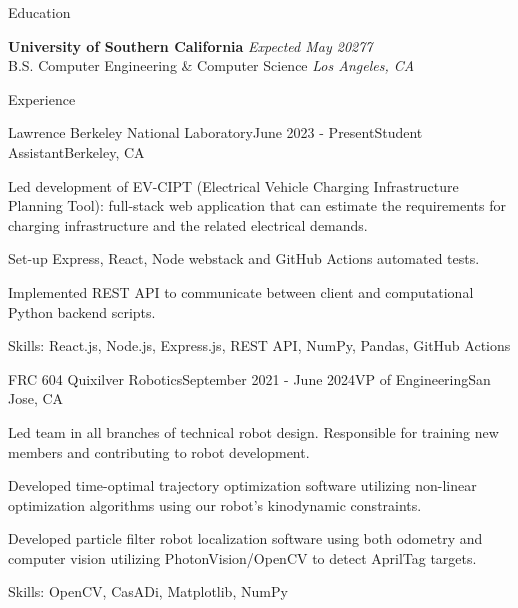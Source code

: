 \documentclass[
	11pt, %
]{tex/resume} %
\begin{document}

\begin{rSection}{Education}
	
	\textbf{University of Southern California} \hfill \textit{Expected May 20277} \\ 
	B.S. Computer Engineering \& Computer Science \hfill \textit{Los Angeles, CA}
	
\end{rSection}


\begin{rSection}{Experience}

	\begin{rSubsection}{Lawrence Berkeley National Laboratory}{June 2023 - Present}{Student Assistant}{Berkeley, CA}
		\item Led development of EV-CIPT (Electrical Vehicle Charging Infrastructure Planning Tool): full-stack web application that can estimate the requirements for charging infrastructure and the related electrical demands.
        \item Set-up Express, React, Node webstack and GitHub Actions automated tests.
        \item Implemented REST API to communicate between client and computational Python backend scripts.
        \item Skills: React.js, Node.js, Express.js, REST API, NumPy, Pandas, GitHub Actions
        
	\end{rSubsection}


	\begin{rSubsection}{FRC 604 Quixilver Robotics}{September 2021 - June 2024}{VP of Engineering}{San Jose, CA}
		\item Led team in all branches of technical robot design. Responsible for training new members and contributing to robot development.
        \item Developed time-optimal trajectory optimization software utilizing non-linear optimization algorithms using our robot’s kinodynamic constraints.
        \item Developed particle filter robot localization software using both odometry and computer vision utilizing PhotonVision/OpenCV to detect AprilTag targets.
        \item Skills: OpenCV, CasADi, Matplotlib, NumPy
        
	\end{rSubsection}





\end{rSection}
\end{document}
